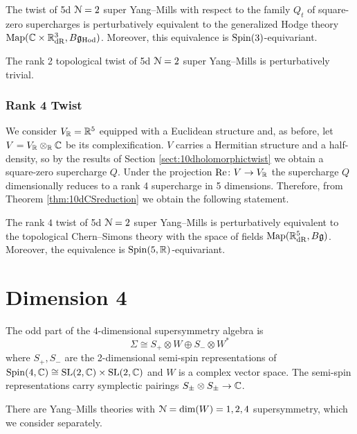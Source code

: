 \documentclass[10pt, oneside]{article}
\begin{document}
\begin{theorem}
The twist of 5d $\mathcal N=2$ super Yang--Mills with respect to the family $Q_t$ of square-zero supercharges is perturbatively equivalent to the generalized Hodge theory $\operatorname{Map}(\mathbb C\times \mathbb R^3_{\mathrm{dR}}, B\mathfrak g_{\mathrm{Hod}})$. Moreover, this equivalence is $\mathrm{Spin}(3)$-equivariant.
\label{thm:5dHodgetwist}
\end{theorem}

\begin{corollary}
The rank 2 topological twist of 5d $\mathcal N=2$ super Yang--Mills is perturbatively trivial.
\label{cor:5drank2topologicaltwist}
\end{corollary}

\subsubsection{Rank 4 Twist}
\label{sect:5drank4twist}

We consider $V_\mathbb R=\mathbb R^5$ equipped with a Euclidean structure and, as before, let $V=V_\mathbb R\otimes_\mathbb R\mathbb C$ be its complexification. $V$ carries a Hermitian structure and a half-density, so by the results of Section \ref{sect:10dholomorphictwist} we obtain a square-zero supercharge $Q$. Under the projection $\mathrm{Re}\colon V\rightarrow V_\mathbb R$ the supercharge $Q$ dimensionally reduces to a rank 4 supercharge in 5 dimensions. Therefore, from Theorem \ref{thm:10dCSreduction} we obtain the following statement.

\begin{theorem}
The rank $4$ twist of 5d $\mathcal N=2$ super Yang--Mills is perturbatively equivalent to the topological Chern--Simons theory with the space of fields $\operatorname{Map}(\mathbb R^5_{\mathrm{dR}}, B\mathfrak g)$. Moreover, the equivalence is $\mathrm{Spin}(5, \mathbb R)$-equivariant.
\end{theorem}
 
\section{Dimension 4}

The odd part of the $4$-dimensional supersymmetry algebra is
\[
\Sigma\cong S_+\otimes W\oplus S_-\otimes W^*
\] 
where $S_+, S_-$ are the 2-dimensional semi-spin representations of $\mathrm{Spin}(4, \mathbb C)\cong \mathrm{SL}(2, \mathbb C) \times \mathrm{SL}(2, \mathbb C)$ and $W$ is a complex vector space. 
The semi-spin representations carry symplectic pairings $S_\pm\otimes S_\pm\rightarrow \mathbb C$.

There are Yang--Mills theories with $\mathcal N= \dim(W) = 1,2,4$ supersymmetry, which we consider separately.
\end{document}
